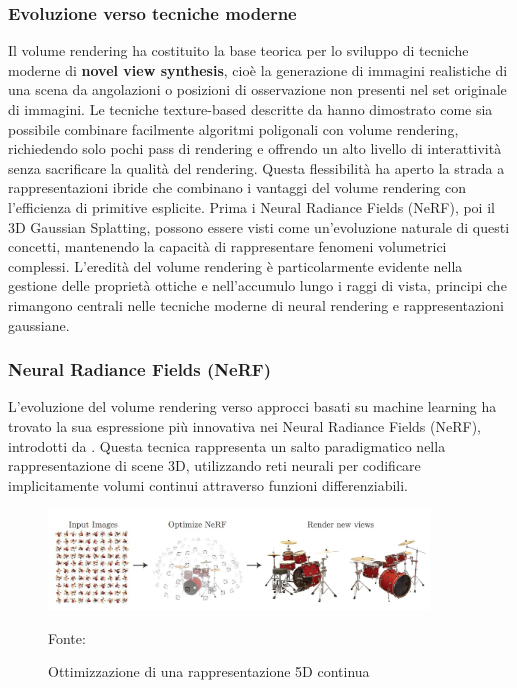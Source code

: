 \subsubsection{Evoluzione verso tecniche moderne}

Il volume rendering ha costituito la base teorica per lo sviluppo di tecniche moderne di \textbf{novel view synthesis}, cioè la generazione di immagini realistiche di una scena da angolazioni o posizioni di osservazione non presenti nel set originale di immagini. Le tecniche texture-based descritte da \cite{ikits2004volume} hanno dimostrato come sia possibile combinare facilmente algoritmi poligonali con volume rendering, richiedendo solo pochi pass di rendering e offrendo un alto livello di interattività senza sacrificare la qualità del rendering.
\newline
\newline
Questa flessibilità ha aperto la strada a rappresentazioni ibride che combinano i vantaggi del volume rendering con l'efficienza di primitive esplicite. Prima i Neural Radiance Fields (NeRF), poi il 3D Gaussian Splatting, possono essere visti come un'evoluzione naturale di questi concetti, mantenendo la capacità di rappresentare fenomeni volumetrici complessi.
\newline
\newline
L'eredità del volume rendering è particolarmente evidente nella gestione delle proprietà ottiche e nell'accumulo lungo i raggi di vista, principi che rimangono centrali nelle tecniche moderne di neural rendering e rappresentazioni gaussiane.

\subsubsection{Neural Radiance Fields (NeRF)}

L'evoluzione del volume rendering verso approcci basati su machine learning ha trovato la sua espressione più innovativa nei Neural Radiance Fields (NeRF), introdotti da \cite{mildenhall2020nerf}. Questa tecnica rappresenta un salto paradigmatico nella rappresentazione di scene 3D, utilizzando reti neurali per codificare implicitamente volumi continui attraverso funzioni differenziabili.

\begin{figure}[htbp]
	\centering
	\includegraphics[width=0.9\textwidth]{images/5d_optimization.jpg}
	\caption{Ottimizzazione di una rappresentazione 5D continua}
	Fonte: \cite{5d_optimization}
\end{figure}

